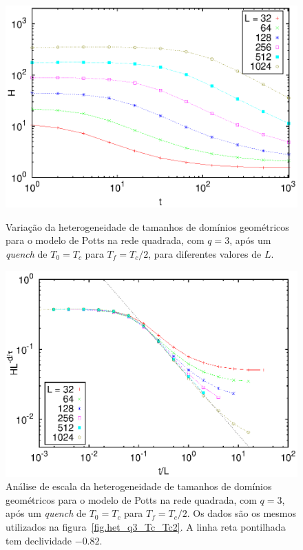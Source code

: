 \begin{figure}[p]
 \centering
 \includegraphics[width=14cm]{fig/het_q3_Tc_Tc2.eps}
 \caption{Variação da heterogeneidade de tamanhos de domínios geométricos para o modelo de Potts na rede quadrada, com $q=3$, após um \textit{quench} de $T_0=T_c$ para $T_f=T_c/2$, para diferentes valores de $L$.}
\label{fig.het_q3_Tc_Tc2}
\vspace{8mm}
 \includegraphics[width=14cm]{fig/het_q3_Tc_Tc2_colXY.eps}
 \caption{Análise de escala da heterogeneidade de tamanhos de domínios geométricos para o modelo de Potts na rede quadrada, com $q=3$, após um \textit{quench} de $T_0=T_c$ para $T_f=T_c/2$. Os dados são os mesmos utilizados na figura~\ref{fig.het_q3_Tc_Tc2}. A linha reta pontilhada tem declividade $-0.82$.}
\label{fig.het_q3_Tc_Tc2_colXY}
\end{figure}


